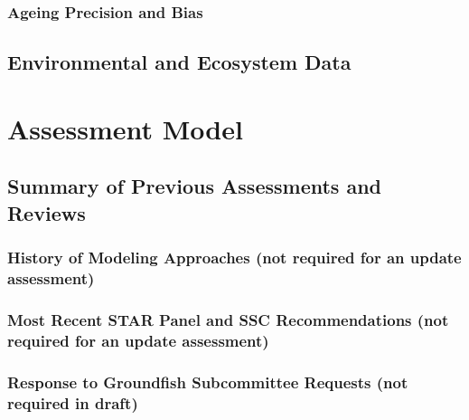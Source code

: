 \documentclass[11pt,
  english,
  letterpaper,
]{article}
\begin{document}
\hypertarget{ageing-precision-and-bias}{%
\subsubsection{Ageing Precision and Bias}\label{ageing-precision-and-bias}}

\hypertarget{environmental-and-ecosystem-data}{%
\subsection{Environmental and Ecosystem Data}\label{environmental-and-ecosystem-data}}

\hypertarget{assessment-model}{%
\section{Assessment Model}\label{assessment-model}}

\hypertarget{summary-of-previous-assessments-and-reviews}{%
\subsection{Summary of Previous Assessments and Reviews}\label{summary-of-previous-assessments-and-reviews}}

\hypertarget{history-of-modeling-approaches-not-required-for-an-update-assessment}{%
\subsubsection{History of Modeling Approaches (not required for an update assessment)}\label{history-of-modeling-approaches-not-required-for-an-update-assessment}}

\hypertarget{most-recent-star-panel-and-ssc-recommendations-not-required-for-an-update-assessment}{%
\subsubsection{Most Recent STAR Panel and SSC Recommendations (not required for an update assessment)}\label{most-recent-star-panel-and-ssc-recommendations-not-required-for-an-update-assessment}}

\hypertarget{response-to-groundfish-subcommittee-requests-not-required-in-draft}{%
\subsubsection{Response to Groundfish Subcommittee Requests (not required in draft)}\label{response-to-groundfish-subcommittee-requests-not-required-in-draft}}
\end{document}
